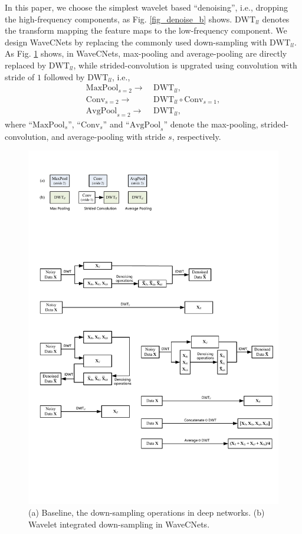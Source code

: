 \documentclass[10pt,twocolumn,letterpaper]{article}
\begin{document}
In this paper, we choose the simplest wavelet based ``denoising'', i.e., dropping the high-frequency components,
as Fig. \ref{fig_denoise_b} shows.
$\text{DWT}_{ll}$ denotes the transform mapping the feature maps to the low-frequency component.
We design WaveCNets by replacing the commonly used down-sampling with $\text{DWT}_{ll}$.
As Fig. \ref{fig_down_sampling_of_dwt} shows, in WaveCNets, max-pooling and average-pooling are directly replaced by $\text{DWT}_{ll}$,
while strided-convolution is upgrated using convolution with stride of $1$ followed by $\text{DWT}_{ll}$,
i.e.,
\begin{align}
\label{eq_maxpool_up}
\text{MaxPool}_{s = 2} \rightarrow &\ \text{DWT}_{ll},\\
\label{eq_conv_up}
\text{Conv}_{s = 2} \rightarrow &\ \text{DWT}_{ll} \circ \text{Conv}_{s=1},\\
\label{eq_avgpool_up}
\text{AvgPool}_{s = 2} \rightarrow &\ \text{DWT}_{ll},
\end{align}
where ``$\text{MaxPool}_s$'', ``$\text{Conv}_s$'' and ``$\text{AvgPool}_s$'' denote the max-pooling,
strided-convolution, and average-pooling with stride $s$, respectively.
\begin{figure}[t]
	\centering
	\includegraphics*[scale=0.85, viewport=25 698 295 785]{figures/Visio-down_sampling_of_dwt.pdf}
	\caption{(a) Baseline, the down-sampling operations in deep networks.
	(b) Wavelet integrated down-sampling in WaveCNets.
	}\label{fig_down_sampling_of_dwt}
\end{figure}
\end{document}
